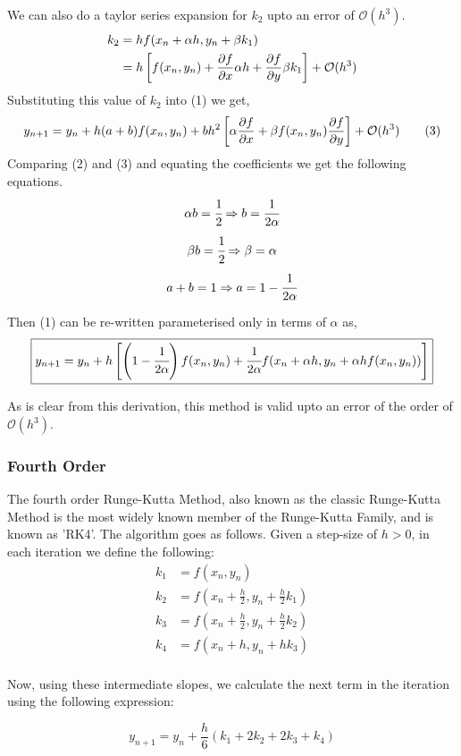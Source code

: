 \documentclass{scrartcl}
\newcommand{\bigO}{\mathcal{O}}
\begin{document}
We can also do a taylor series expansion for $k_2$ upto an error of $\bigO(h^3)$.
\begin{align*}
    k_2 &= hf(x_n + \alpha h, y_n + \beta k_1) \\ 
        &= h\left[ f(x_n, y_n) + \pdv{f}{x}\alpha h + \pdv{f}{y}\beta k_1 \right] + \bigO(h^3) \\ 
\end{align*}
Substituting this value of $k_2$ into (1) we get, 
\begin{align*}
    y_{n+1} = y_n + h(a + b)f(x_n, y_n) + bh^2\left[ \alpha \pdv{f}{x} + \beta f(x_n, y_n) \pdv{f}{y} \right] + \bigO(h^3) \tag{3}
\end{align*}
Comparing (2) and (3) and equating the coefficients we get the following equations.
$$\alpha b = \cfrac{1}{2} \Rightarrow b = \cfrac{1}{2\alpha}$$
$$\beta b = \cfrac{1}{2} \Rightarrow \beta = \alpha$$
$$a + b = 1 \Rightarrow a = 1 - \cfrac{1}{2\alpha}$$

Then (1) can be re-written parameterised only in terms of $\alpha$ as,
$$\boxed{y_{n+1} = y_n + h\left[\left(1 - \cfrac{1}{2\alpha}\right)f(x_n, y_n) + \cfrac{1}{2\alpha}f(x_n + \alpha h, y_n + \alpha hf(x_n, y_n))\right]}$$

As is clear from this derivation, this method is valid upto an error of the order of $\bigO(h^3)$.

\subsubsection{Fourth Order}
The fourth order Runge-Kutta Method, also known as the classic Runge-Kutta Method is the most widely known member of the Runge-Kutta Family, and is known as 'RK4'. The algorithm goes as follows. Given a step-size of $h > 0$, in each iteration we define the following:
\begin{align*}
    k_1 &= f(x_n, y_n) \\    
    k_2 &= f\left(x_n + \frac{h}{2}, y_n + \frac{h}{2}k_1\right) \\
    k_3 &= f\left(x_n + \frac{h}{2}, y_n + \frac{h}{2}k_2\right) \\
    k_4 &= f\left(x_n + h, y_n + hk_3\right) \\
\end{align*}

Now, using these intermediate slopes, we calculate the next term in the iteration using the following expression:

$$\boxed{y_{n + 1} = y_n + \frac{h}{6}(k_1 + 2k_2 + 2k_3 + k_4)}$$
\end{document}
